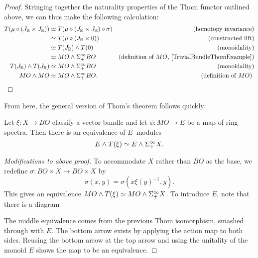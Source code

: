 \begin{proof}
Stringing together the naturality properties of the Thom functor outlined above, we can thus make the following calculation:
\begin{align*}
T(\mu \circ (J_{\R} \times J_{\R})) & \simeq T(\mu \circ (J_{\R} \times J_{\R}) \circ \sigma) & \text{(homotopy invariance)} \\
& \simeq T(\mu \circ (J_{\R} \times 0)) & \text{(constructed lift)} \\
& \simeq T(J_{\R}) \sm T(0) & \text{(monoidality)} \\
& \simeq MO \sm \Susp^\infty_+ BO & \text{(definition of $MO$, \Cref{TrivialBundleThomExample})} \\
T(J_{\R}) \sm T(J_{\R}) & \simeq MO \sm \Susp^\infty_+ BO & \text{(monoidality)} \\
MO \sm MO & \simeq MO \sm \Susp^\infty_+ BO. & \text{(definition of $MO$) \qedhere}
\end{align*}
\end{proof}

From here, the general version of Thom's theorem follows quickly:
\begin{theorem}
Let $\xi: X \to BO$ classify a vector bundle and let $\phi: MO \to E$ be a map of ring spectra. Then there is an equivalence of $E$--modules \[E \wedge T(\xi) \simeq E \wedge \Sigma^\infty_+ X.\]
\end{theorem}
\begin{proof}[Modifications to above proof]
To accommodate $X$ rather than $BO$ as the base, we redefine $\sigma: BO \times X \to BO \times X$ by \[\sigma(x, y) = \sigma(x \xi(y)^{-1}, y).\]  This gives an equivalence $MO \wedge T(\xi) \simeq MO \wedge \Sigma^\infty_+ X$.  To introduce $E$, note that there is a diagram
\begin{center}
\end{center}
The middle equivalence comes from the previous Thom isomorphism, smashed through with $E$.  The bottom arrow exists by applying the action map to both sides.  Reusing the bottom arrow at the top arrow and using the unitality of the monoid $E$ shows the map to be an equivalence.
\end{proof}

